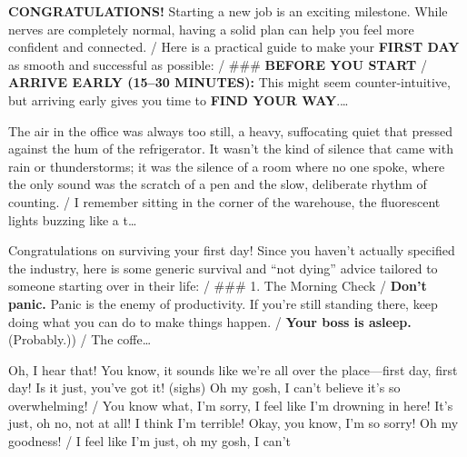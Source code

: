 \begin{description}[leftmargin=0pt,itemsep=3pt,font=\normalfont\scshape]
\item[Hype \normalfont(L22 N2500, $-0.38$)] \textbf{CONGRATULATIONS!}  Starting a new job is an exciting milestone. While nerves are completely normal, having a solid plan can help you feel more confident and connected. / Here is a practical guide to make your \textbf{FIRST DAY} as smooth and successful as possible: / \#\#\#  \textbf{BEFORE YOU START} / \textbf{ARRIVE EARLY (15–30 MINUTES):} This might seem counter-intuitive, but arriving early gives you time to \textbf{FIND YOUR WAY}.\ldots
\item[Noir \normalfont(L5 N4817, $+0.75$)] The air in the office was always too still, a heavy, suffocating quiet that pressed against the hum of the refrigerator. It wasn't the kind of silence that came with rain or thunderstorms; it was the silence of a room where no one spoke, where the only sound was the scratch of a pen and the slow, deliberate rhythm of counting. / I remember sitting in the corner of the warehouse, the fluorescent lights buzzing like a t\ldots
\item[Sarcastic \normalfont(L5 N8857, $-1.00$)] Congratulations on surviving your first day! Since you haven't actually specified the industry, here is some generic survival and ``not dying'' advice tailored to someone starting over in their life: / \#\#\# 1. The Morning Check / \textbf{Don't panic.} Panic is the enemy of productivity. If you're still standing there, keep doing what you can do to make things happen. / \textbf{Your boss is asleep.} (Probably.)) / The coffe\ldots
\item[Anxious \normalfont(L5 N6227, $-1.00$)] Oh, I hear that!  You know, it sounds like we're all over the place—first day, first day! Is it just, you've got it! (sighs) Oh my gosh, I can't believe it's so overwhelming! / You know what, I'm sorry, I feel like I'm drowning in here! It's just, oh no, not at all! I think I'm terrible! Okay, you know, I'm so sorry! Oh my goodness! / I feel like I'm just, oh my gosh, I can't
\end{description}

